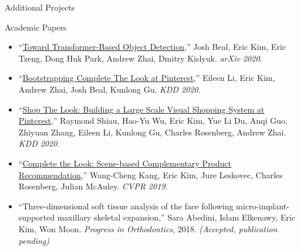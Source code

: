 \documentclass{resume}
\begin{document}
\begin{component}{Additional Projects}
\begin{itemize}
	\end{itemize}
\end{component}

\vspace{-0.75em}

\begin{component}{Academic Papers}
\vspace{-0.25em}
\begin{itemize}
\item[] ``\href{https://arxiv.org/abs/2012.09958}{Toward Transformer-Based Object Detection},'' Josh Beal, Eric Kim, Eric Tzeng, Dong Huk Park, Andrew Zhai, Dmitry Kislyuk. \emph{arXiv 2020}.
\vspace{-0.5em}
\item[] ``\href{https://arxiv.org/abs/2006.10792}{Bootstrapping Complete The Look at Pinterest},'' Eileen Li, Eric Kim, Andrew Zhai, Josh Beal, Kunlong Gu. \emph{KDD 2020}.
\vspace{-1.0em}
\item[] ``\href{https://arxiv.org/abs/2006.10866}{Shop The Look: Building a Large Scale Visual Shopping System at Pinterest},'' Raymond Shiau, Hao-Yu Wu, Eric Kim, Yue Li Du, Anqi Guo, Zhiyuan Zhang, Eileen Li, Kunlong Gu, Charles Rosenberg, Andrew Zhai. \emph{KDD 2020}.
\vspace{-0.5em}
\item[] ``\href{https://arxiv.org/abs/1812.01748}{Complete the Look: Scene-based Complementary Product Recommendation},'' Wang-Cheng Kang, Eric Kim, Jure Leskovec, Charles Rosenberg, Julian McAuley. \emph{CVPR 2019}.
\vspace{-0.5em}
\item[] ``Three-dimensional soft tissue analysis of the face following micro-implant-supported maxillary skeletal expansion,'' Sara Abedini, Islam Elkenawy, Eric Kim, Won Moon. \emph{Progress in Orthodontics}, 2018. \emph{(Accepted, publication pending)}
  \vspace{-0.5em}

\end{itemize}
\end{component}
\end{document}
